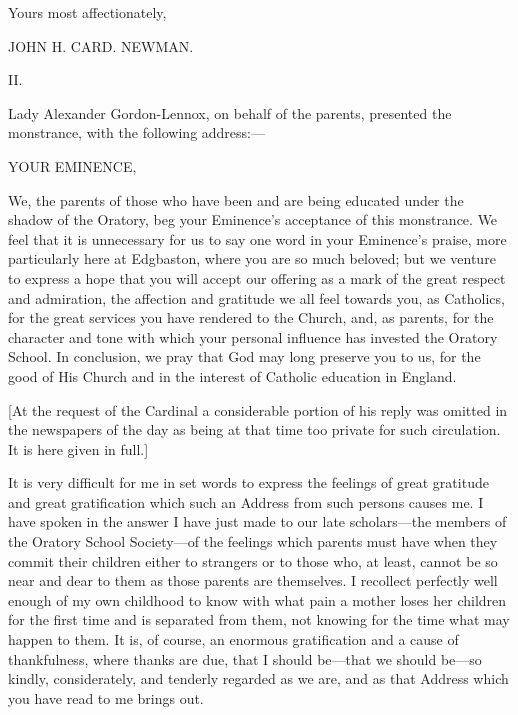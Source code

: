 Yours most affectionately,

JOHN H. CARD. NEWMAN.

II.


Lady Alexander Gordon-Lennox, on behalf of the parents, presented
the monstrance, with the following address:—

YOUR EMINENCE,

We, the parents of those who have been and are being educated under
the shadow of the Oratory, beg your Eminence's acceptance of this
monstrance. We feel that it is unnecessary for us to say one word in
your Eminence's praise, more particularly here at Edgbaston, where you
are so much beloved; but we venture to express a hope that you will
accept our offering as a mark of the great respect and admiration, the
affection and gratitude we all feel towards you, as Catholics, for the
great services you have rendered to the Church, and, as parents, for
the character and tone with which your personal influence has invested
the Oratory School. In conclusion, we pray that God may long preserve
you to us, for the good of His Church and in the interest of Catholic
education in England.


[At the request of the Cardinal a considerable portion of his reply
was omitted in the newspapers of the day as being at that time too
private for such circulation. It is here given in full.]

It is very difficult for me in set words to express the feelings of
great gratitude and great gratification which such an Address from
such persons causes me. I have spoken in the answer I have just made
to our late scholars—the members of the Oratory School Society—of
the feelings which parents must have when they commit their children
either to strangers or to those who, at least, cannot be so near and
dear to them as those parents are themselves. I recollect perfectly
well enough of my own childhood to know with what pain a mother loses
her children for the first time and is separated from them, not
knowing for the time what may happen to them. It is, of course, an
enormous gratification and a cause of thankfulness, where thanks are
due, that I should be—that we should be—so kindly, considerately,
and tenderly regarded as we are, and as that Address which you have
read to me brings out.

